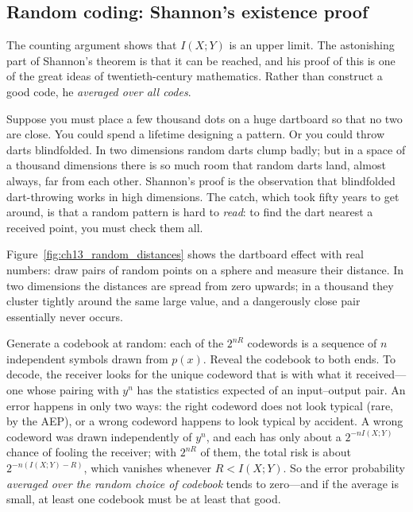 
\subsection{Random coding: Shannon's existence proof}

The counting argument shows that $I(X;Y)$ is an upper limit. The astonishing part of Shannon's
theorem is that it can be reached, and his proof of this is one of the great ideas of
twentieth-century mathematics. Rather than construct a good code, he \emph{averaged over all
codes}.

\begin{analogy}
Suppose you must place a few thousand dots on a huge dartboard so that no two are close. You
could spend a lifetime designing a pattern. Or you could throw darts blindfolded. In two
dimensions random darts clump badly; but in a space of a thousand dimensions there is so much room
that random darts land, almost always, far from each other. Shannon's proof is the observation that
blindfolded dart-throwing works in high dimensions. The catch, which took fifty years to get
around, is that a random pattern is hard to \emph{read}: to find the dart nearest a received
point, you must check them all.
\end{analogy}

Figure~\ref{fig:ch13_random_distances} shows the dartboard effect with real numbers: draw pairs of
random points on a sphere and measure their distance. In two dimensions the distances are spread
from zero upwards; in a thousand they cluster tightly around the same large value, and a
dangerously close pair essentially never occurs.

Generate a codebook at random: each of the $2^{nR}$ codewords is a sequence of $n$ independent
symbols drawn from $p(x)$. Reveal the codebook to both ends. To decode, the receiver looks for the
unique codeword that is  with what it received---one whose pairing with
$y^n$ has the statistics expected of an input--output pair. An error happens in only two ways: the
right codeword does not look typical (rare, by the AEP), or a wrong codeword happens to look
typical by accident. A wrong codeword was drawn independently of $y^n$, and each has only about a
$2^{-nI(X;Y)}$ chance of fooling the receiver; with $2^{nR}$ of them, the total risk is about
$2^{-n(I(X;Y)-R)}$, which vanishes whenever $R<I(X;Y)$. So the error probability \emph{averaged
over the random choice of codebook} tends to zero---and if the average is small, at least one
codebook must be at least that good.

